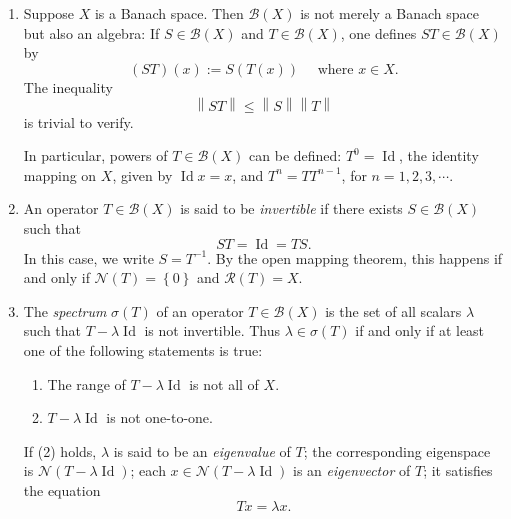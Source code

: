 \begin{definition}
  \label{definition-invertible-operator}
  \label{definition-spectrum}
  \label{definition-eigenvalue}
  \label{definition-eigenvector}
  \begin{enumerate}
    \item Suppose \( X \) is a Banach space.
      Then \( \mathcal{B}(X) \) is not merely a Banach space but also an algebra: If \( S \in \mathcal{B}(X) \) and \( T \in \mathcal{B}(X) \), one defines \( ST \in \mathcal{B}(X) \) by
      \[
        (ST)(x) := S(T(x))\quad \text{ where } x \in X.
      \]
      The inequality
      \[
        \left\lVert ST \right\rVert \leq \left\lVert S \right\rVert \left\lVert T \right\rVert
      \]
      is trivial to verify.

      In particular, powers of \( T \in \mathcal{B}(X) \) can be defined: \( T^0 = \operatorname{Id} \), the identity mapping on \( X \), given by \( \operatorname{Id} x = x \), and \( T^n = T T^{n - 1} \), for \( n = 1, 2, 3, \cdots \).
    \item An operator \( T \in \mathcal{B}(X) \) is said to be \emph{invertible} if there exists \( S \in \mathcal{B}(X) \) such that
      \[
        ST = \operatorname{Id} = TS.
      \]
      In this case, we write \( S = T^{-1} \).
      By the open mapping theorem, this happens if and only if \( \mathcal{N}(T) =\left\lbrace 0 \right\rbrace \) and \( \mathcal{R}(T) = X \).
    \item The \emph{spectrum} \( \sigma(T) \) of an operator \( T \in \mathcal{B}(X) \) is the set of all scalars \( \lambda \) such that \( T - \lambda \operatorname{Id} \) is not invertible.
      Thus \( \lambda \in \sigma(T) \) if and only if at least one of the following statements is true:
      \begin{enumerate}
        \item The range of \( T - \lambda \operatorname{Id} \) is not all of \( X \).
        \item \( T - \lambda \operatorname{Id} \) is not one-to-one.
      \end{enumerate}
      If (2) holds, \( \lambda \) is said to be an \emph{eigenvalue} of \( T \);
      the corresponding eigenspace is \( \mathcal{N}(T - \lambda \operatorname{Id}) \);
      each \( x \in \mathcal{N}(T - \lambda \operatorname{Id}) \) is an \emph{eigenvector} of \( T \);
      it satisfies the equation
      \[
        T x = \lambda x.
      \]
  \end{enumerate}
\end{definition}


